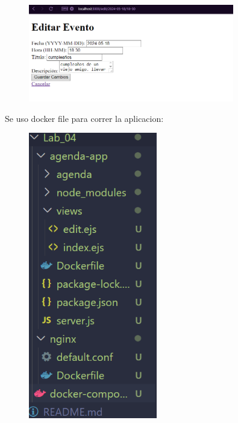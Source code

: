 \documentclass{article}
\begin{document}
\begin{figure}[H]
		          \centering
		          \includegraphics[width=0.8\textwidth,keepaspectratio]                       {img/prueba2Ag.png}
    \end{figure} 
Se uso docker file para correr la aplicacion:

    \begin{figure}[H]
		          \centering
		          \includegraphics[width=0.5\textwidth,keepaspectratio]                       {img/dockerAg.png}
    \end{figure} 
\end{document}
